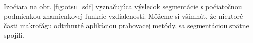 \documentclass[a4paper,11pt,oneside]{article}%
\begin{document}
Izočiara na obr. \ref{fig:otsu_sdf} vyznačujúca výsledok segmentácie s počiatočnou podmienkou znamienkovej funkcie vzdialenosti. Môžeme si všimnúť, že niektoré časti makrofágu odtrhnuté aplikáciou prahovacej metódy, sa segmentáciou spätne spojili. 

\begin{figure}[H]  
    \hspace{5px}

\end{figure}
\end{document}
